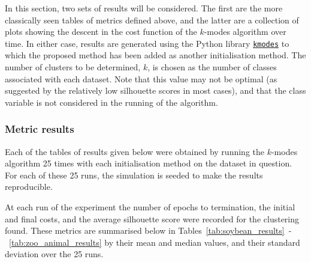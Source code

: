 In this section, two sets of results will be considered. The first are the more
classically seen tables of metrics defined above, and the latter are a
collection of plots showing the descent in the cost function of the \(k\)-modes
algorithm over time. In either case, results are generated using the Python
library \href{https://github.com/nicodv/kmodes}{\texttt{kmodes}} to which the
proposed method has been added as another initialisation method. The number of
clusters to be determined, \(k\), is chosen as the number of classes associated
with each dataset. Note that this value may not be optimal (as suggested by the
relatively low silhouette scores in most cases), and that the class variable is
not considered in the running of the algorithm.

\subsubsection{Metric results}

Each of the tables of results given below were obtained by running the
\(k\)-modes algorithm 25 times with each initialisation method on the dataset in
question. For each of these 25 runs, the simulation is seeded to make the
results reproducible.

At each run of the experiment the number of epochs to termination, the initial
and final costs, and the average silhouette score were recorded for the
clustering found. These metrics are summarised below in
Tables~\ref{tab:soybean_results}~\--~\ref{tab:zoo_animal_results} by their mean
and median values, and their standard deviation over the 25 runs.

\begin{table}
    \centering
    \resizebox{\textwidth}{!}{%
        
    }
    \label{tab:soybean_summary}\vspace{20pt}

    \resizebox{\textwidth}{!}{%
        
    }
    \label{tab:mushroom_summary}\vspace{20pt}

    \resizebox{\textwidth}{!}{%
        
    }
    \label{tab:breast_cancer_summary}\vspace{20pt}

    \resizebox{\textwidth}{!}{%
        
    }
    \label{tab:zoo_summary}
\end{table}

